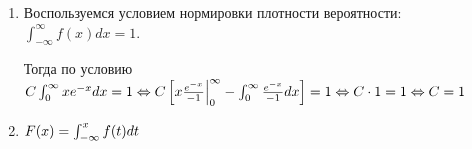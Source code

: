 \begin{enumerate}
\begin{enumerate}[label=\arabic*)]
\item Воспользуемся условием нормировки плотности вероятности: $\int_{-\infty}^{\infty} f(x)dx = 1$.

Тогда по условию $C\int_{0}^{\infty}xe^{-x}dx=1\Leftrightarrow
C  \left[x \frac{e^{-x}}{-1}\Bigr|_{0}^{\infty} -\int\displaylimits_{0}^{\infty}\frac{e^{-x}} {-1}dx\right] =1\Leftrightarrow
C \cdot 1 = 1 \Leftrightarrow C = 1$

\item
$F(x)=\int\displaylimits_{-\infty}^{x}f(t)dt$
\end{enumerate}

\end{enumerate}


